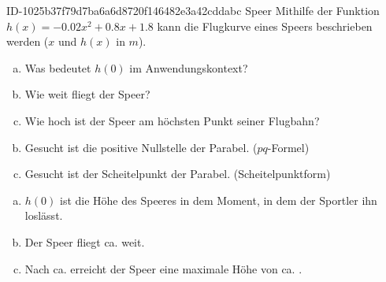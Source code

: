 \begin{exercise}
      {ID-1025b37f79d7ba6a6d8720f146482e3a42cddabc}
      {Speer}
  \ifproblem\problem
    Mithilfe der Funktion $h(x)=\num{-0.02}x^{2}+\num{0.8}x+\num{1.8}$ kann die Flugkurve
    eines Speers beschrieben werden ($x$ und $h(x)$ in $m$).
    \begin{enumerate}[a)]
      \item Was bedeutet $h(0)$ im Anwendungskontext?
      \item Wie weit fliegt der Speer?
      \item Wie hoch ist der Speer am höchsten Punkt seiner Flugbahn?
    \end{enumerate}
  \fi
  \ifoutline\outline
    \begin{enumerate}[a)]
      \setcounter{enumi}{1}
      \item Gesucht ist die positive Nullstelle der Parabel. ($pq$-Formel)
      \item Gesucht ist der Scheitelpunkt der Parabel. (Scheitelpunktform)
    \end{enumerate}
  \fi
  \ifoutcome\outcome
    \begin{enumerate}[a)]
      \item $h(0)$ ist die Höhe des Speeres in dem Moment, in dem der Sportler ihn loslässt.
      \item Der Speer fliegt ca.  weit.
      \item Nach ca.  erreicht der Speer eine maximale Höhe von ca. .
    \end{enumerate}
  \fi
\end{exercise}

